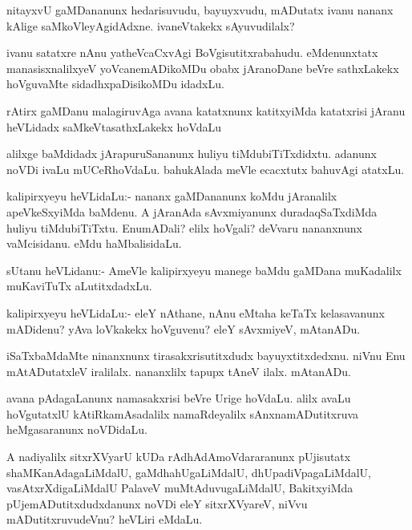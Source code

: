 \begin{mng}
nitayxvU gaMDananunx hedarisuvudu, bayuyxvudu, mADutatx ivanu nananx kAlige saMkoVleyAgidAdxne. ivaneVtakekx sAyuvudilalx?
\end{mng}

\begin{mng}
ivanu satatxre nAnu yatheVcaCxvAgi BoVgisutitxrabahudu. eMdenunxtatx manasisxnalilxyeV yoVcanemADikoMDu obabx jAranoDane beVre sathxLakekx hoVguvaMte sidadhxpaDisikoMDu idadxLu.
\end{mng}

\begin{mng}
rAtirx gaMDanu malagiruvAga avana katatxnunx katitxyiMda katatxrisi jAranu heVLidadx saMkeVtasathxLakekx hoVdaLu
\end{mng}

\begin{mng}
alilxge baMdidadx jArapuruSananunx huliyu tiMdubiTiTxdidxtu. adanunx noVDi ivaLu mUCeRhoVdaLu. bahukAlada meVle ecacxtutx bahuvAgi atatxLu.
\end{mng}

\begin{mng}
kalipirxyeyu heVLidaLu:- nananx gaMDananunx koMdu jAranalilx apeVkeSxyiMda baMdenu. A jAranAda sAvxmiyanunx duradaqSaTxdiMda huliyu tiMdubiTiTxtu. EnumADali? elilx hoVgali? deVvaru nananxnunx vaMcisidanu. eMdu haMbalisidaLu.
\end{mng}

\begin{mng}
sUtanu heVLidanu:- AmeVle kalipirxyeyu manege baMdu gaMDana muKadalilx muKaviTuTx aLutitxdadxLu.
\end{mng}

\begin{mng}
kalipirxyeyu heVLidaLu:- eleY nAthane, nAnu eMtaha keTaTx kelasavanunx mADidenu? yAva loVkakekx hoVguvenu? eleY sAvxmiyeV, mAtanADu.
\end{mng}

\begin{mng}
iSaTxbaMdaMte ninanxnunx tirasakxrisutitxdudx bayuyxtitxdedxnu. niVnu Enu mAtADutatxleV iralilalx. nananxlilx tapupx tAneV ilalx. mAtanADu.
\end{mng}

\begin{mng}
avana pAdagaLanunx namasakxrisi beVre Urige hoVdaLu. alilx avaLu hoVgutatxlU kAtiRkamAsadalilx namaRdeyalilx sAnxnamADutitxruva heMgasaranunx noVDidaLu.
\end{mng}

\begin{mng}
A nadiyalilx sitxrXVyarU kUDa rAdhAdAmoVdararanunx pUjisutatx shaMKanAdagaLiMdalU, gaMdhahUgaLiMdalU, dhUpadiVpagaLiMdalU, vasAtxrXdigaLiMdalU PalaveV muMtAduvugaLiMdalU, BakitxyiMda pUjemADutitxdudxdanunx noVDi eleY sitxrXVyareV, niVvu mADutitxruvudeVnu? heVLiri eMdaLu.
\end{mng}

